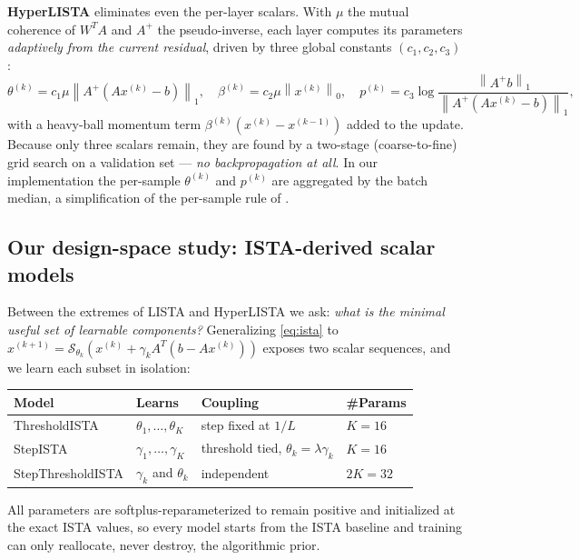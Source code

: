 \documentclass[12pt,a4paper]{article}
\newcommand{\norm}[1]{\left\lVert #1 \right\rVert}
\newcommand{\st}{\mathcal{S}}
\begin{document}
\textbf{HyperLISTA} \cite{chen2021hyperlista} eliminates even the per-layer scalars. With $\mu$ the mutual coherence of $W^{T}\!A$ and $A^{+}$ the pseudo-inverse, each layer computes its parameters \emph{adaptively from the current residual}, driven by three global constants $(c_1,c_2,c_3)$:
\begin{equation}
\theta^{(k)} = c_1 \mu \norm{A^{+}(Ax^{(k)}-b)}_1, \quad
\beta^{(k)} = c_2 \mu \norm{x^{(k)}}_0, \quad
p^{(k)} = c_3 \log\frac{\norm{A^{+}b}_1}{\norm{A^{+}(Ax^{(k)}-b)}_1},
\end{equation}
with a heavy-ball momentum term $\beta^{(k)}(x^{(k)}-x^{(k-1)})$ added to the update. Because only three scalars remain, they are found by a two-stage (coarse-to-fine) grid search on a validation set --- \emph{no backpropagation at all}. In our implementation the per-sample $\theta^{(k)}$ and $p^{(k)}$ are aggregated by the batch median, a simplification of the per-sample rule of \cite{chen2021hyperlista}.

\subsection{Our design-space study: ISTA-derived scalar models}

Between the extremes of LISTA and HyperLISTA we ask: \emph{what is the minimal useful set of learnable components?} Generalizing \eqref{eq:ista} to $x^{(k+1)} = \st_{\theta_k}( x^{(k)} + \gamma_k A^{T}(b - A x^{(k)}))$ exposes two scalar sequences, and we learn each subset in isolation:

\begin{center}
\begin{tabular}{@{}llll@{}}
\toprule
Model & Learns & Coupling & \#Params\\
\midrule
ThresholdISTA & $\theta_1,\dots,\theta_K$ & step fixed at $1/L$ & $K=16$\\
StepISTA & $\gamma_1,\dots,\gamma_K$ & threshold tied, $\theta_k = \lambda\gamma_k$ & $K=16$\\
StepThresholdISTA & $\gamma_k$ and $\theta_k$ & independent & $2K=32$\\
\bottomrule
\end{tabular}
\end{center}

All parameters are softplus-reparameterized to remain positive and initialized at the exact ISTA values, so every model starts from the ISTA baseline and training can only reallocate, never destroy, the algorithmic prior.
\end{document}
